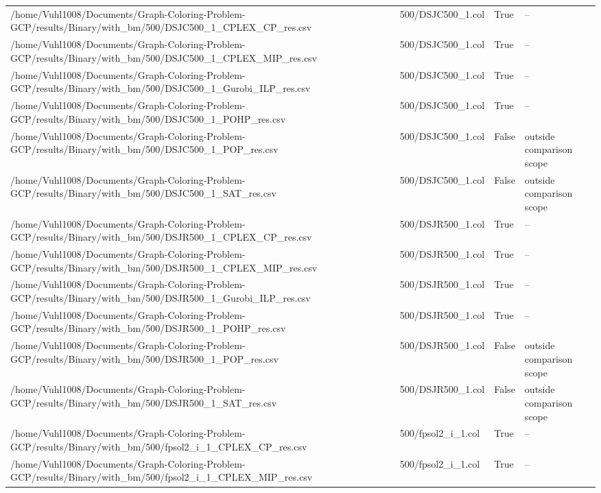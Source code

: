 \begin{table}[htbp]
\begin{tabular}{llll}
/home/Vuhl1008/Documents/Graph-Coloring-Problem-GCP/results/Binary/with\_bm/500/DSJC500\_1\_CPLEX\_CP\_res.csv & 500/DSJC500\_1.col & True & -- \\
/home/Vuhl1008/Documents/Graph-Coloring-Problem-GCP/results/Binary/with\_bm/500/DSJC500\_1\_CPLEX\_MIP\_res.csv & 500/DSJC500\_1.col & True & -- \\
/home/Vuhl1008/Documents/Graph-Coloring-Problem-GCP/results/Binary/with\_bm/500/DSJC500\_1\_Gurobi\_ILP\_res.csv & 500/DSJC500\_1.col & True & -- \\
/home/Vuhl1008/Documents/Graph-Coloring-Problem-GCP/results/Binary/with\_bm/500/DSJC500\_1\_POHP\_res.csv & 500/DSJC500\_1.col & True & -- \\
/home/Vuhl1008/Documents/Graph-Coloring-Problem-GCP/results/Binary/with\_bm/500/DSJC500\_1\_POP\_res.csv & 500/DSJC500\_1.col & False & outside comparison scope \\
/home/Vuhl1008/Documents/Graph-Coloring-Problem-GCP/results/Binary/with\_bm/500/DSJC500\_1\_SAT\_res.csv & 500/DSJC500\_1.col & False & outside comparison scope \\
/home/Vuhl1008/Documents/Graph-Coloring-Problem-GCP/results/Binary/with\_bm/500/DSJR500\_1\_CPLEX\_CP\_res.csv & 500/DSJR500\_1.col & True & -- \\
/home/Vuhl1008/Documents/Graph-Coloring-Problem-GCP/results/Binary/with\_bm/500/DSJR500\_1\_CPLEX\_MIP\_res.csv & 500/DSJR500\_1.col & True & -- \\
/home/Vuhl1008/Documents/Graph-Coloring-Problem-GCP/results/Binary/with\_bm/500/DSJR500\_1\_Gurobi\_ILP\_res.csv & 500/DSJR500\_1.col & True & -- \\
/home/Vuhl1008/Documents/Graph-Coloring-Problem-GCP/results/Binary/with\_bm/500/DSJR500\_1\_POHP\_res.csv & 500/DSJR500\_1.col & True & -- \\
/home/Vuhl1008/Documents/Graph-Coloring-Problem-GCP/results/Binary/with\_bm/500/DSJR500\_1\_POP\_res.csv & 500/DSJR500\_1.col & False & outside comparison scope \\
/home/Vuhl1008/Documents/Graph-Coloring-Problem-GCP/results/Binary/with\_bm/500/DSJR500\_1\_SAT\_res.csv & 500/DSJR500\_1.col & False & outside comparison scope \\
/home/Vuhl1008/Documents/Graph-Coloring-Problem-GCP/results/Binary/with\_bm/500/fpsol2\_i\_1\_CPLEX\_CP\_res.csv & 500/fpsol2\_i\_1.col & True & -- \\
/home/Vuhl1008/Documents/Graph-Coloring-Problem-GCP/results/Binary/with\_bm/500/fpsol2\_i\_1\_CPLEX\_MIP\_res.csv & 500/fpsol2\_i\_1.col & True & -- \\

\end{tabular}
\end{table}
